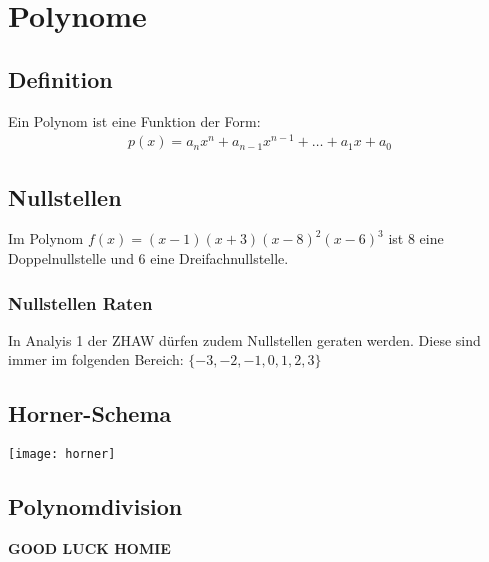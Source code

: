 \section{Polynome}
\subsection{Definition}
Ein Polynom ist eine Funktion der Form:
\begin{align*}
    p(x) = a_n x^n + a_{n-1} x^{n-1} + \ldots + a_1 x + a_0
\end{align*}
\subsection{Nullstellen}
Im Polynom $f(x) = (x-1)(x+3)(x-8)^2(x-6)^3$ ist 8 eine Doppelnullstelle und 6 eine Dreifachnullstelle.\\
\subsubsection{Nullstellen Raten}
In Analyis 1 der ZHAW dürfen zudem Nullstellen geraten werden. Diese sind immer im folgenden Bereich: $\{-3,-2,-1,0,1,2,3\}$
\subsection{Horner-Schema}
\texttt{[image: horner]}
\subsection{Polynomdivision}
\begin{center}
    \textbf{GOOD LUCK HOMIE}
\end{center}
